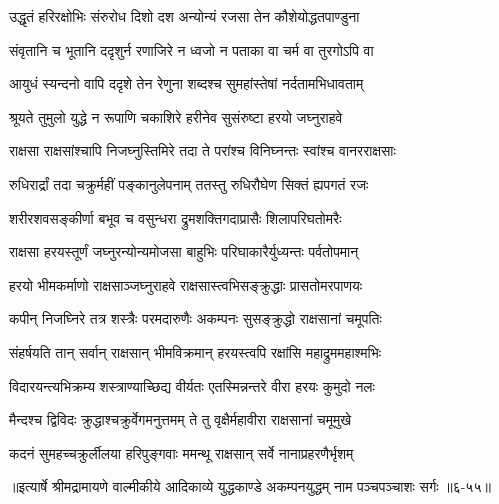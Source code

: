 \twolineshloka
{उद्धृतं हरिरक्षोभिः संरुरोध दिशो दश}
{अन्योन्यं रजसा तेन कौशेयोद्धतपाण्डुना} %

\twolineshloka
{संवृतानि च भूतानि ददृशुर्न रणाजिरे}
{न ध्वजो न पताका वा चर्म वा तुरगोऽपि वा} %

\twolineshloka
{आयुधं स्यन्दनो वापि ददृशे तेन रेणुना}
{शब्दश्च सुमहांस्तेषां नर्दतामभिधावताम्} %

\twolineshloka
{श्रूयते तुमुलो युद्धे न रूपाणि चकाशिरे}
{हरीनेव सुसंरुष्टा हरयो जघ्नुराहवे} %

\twolineshloka
{राक्षसा राक्षसांश्चापि निजघ्नुस्तिमिरे तदा}
{ते परांश्च विनिघ्नन्तः स्वांश्च वानरराक्षसाः} %

\twolineshloka
{रुधिरार्द्रां तदा चक्रुर्महीं पङ्कानुलेपनाम्}
{ततस्तु रुधिरौघेण सिक्तं ह्यपगतं रजः} %

\twolineshloka
{शरीरशवसङ्कीर्णा बभूव च वसुन्धरा}
{द्रुमशक्तिगदाप्रासैः शिलापरिघतोमरैः} %

\twolineshloka
{राक्षसा हरयस्तूर्णं जघ्नुरन्योन्यमोजसा}
{बाहुभिः परिघाकारैर्युध्यन्तः पर्वतोपमान्} %

\twolineshloka
{हरयो भीमकर्माणो राक्षसाञ्जघ्नुराहवे}
{राक्षसास्त्वभिसङ्क्रुद्धाः प्रासतोमरपाणयः} %

\twolineshloka
{कपीन् निजघ्निरे तत्र शस्त्रैः परमदारुणैः}
{अकम्पनः सुसङ्क्रुद्धो राक्षसानां चमूपतिः} %

\twolineshloka
{संहर्षयति तान् सर्वान् राक्षसान् भीमविक्रमान्}
{हरयस्त्वपि रक्षांसि महाद्रुममहाश्मभिः} %

\twolineshloka
{विदारयन्त्यभिक्रम्य शस्त्राण्याच्छिद्य वीर्यतः}
{एतस्मिन्नन्तरे वीरा हरयः कुमुदो नलः} %

\twolineshloka
{मैन्दश्च द्विविदः क्रुद्धाश्चक्रुर्वेगमनुत्तमम्}
{ते तु वृक्षैर्महावीरा राक्षसानां चमूमुखे} %

\twolineshloka
{कदनं सुमहच्चक्रुर्लीलया हरिपुङ्गवाः}
{ममन्थू राक्षसान् सर्वे नानाप्रहरणैर्भृशम्} %


॥इत्यार्षे श्रीमद्रामायणे वाल्मीकीये आदिकाव्ये युद्धकाण्डे अकम्पनयुद्धम् नाम पञ्चपञ्चाशः सर्गः ॥६-५५॥
